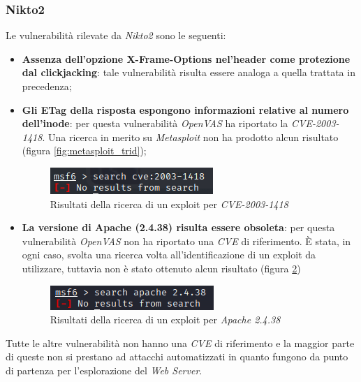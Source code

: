 \subsubsection{Nikto2}
Le vulnerabilità rilevate da \emph{Nikto2} sono le seguenti:
\begin{itemize}
    \item \textbf{Assenza dell'opzione X-Frame-Options nel'header come protezione dal clickjacking}: tale vulnerabilità risulta essere analoga a quella trattata in precedenza;
    \item \textbf{Gli ETag della risposta espongono informazioni relative al numero dell'inode}: per questa vulnerabilità \emph{OpenVAS} ha riportato la \emph{CVE-2003-1418}. Una ricerca in merito su \emph{Metasploit} non ha prodotto alcun risultato (figura \ref{fig:metasploit_trid});
    \begin{figure}[h]
        \centering
        \includegraphics[scale=1]{capitoli/images/metasploit_etag.png}
        \caption{Risultati della ricerca di un exploit per \emph{CVE-2003-1418}}
        \label{fig:metasploit_etag}
    \end{figure}
    \item \textbf{La versione di Apache (2.4.38) risulta essere obsoleta}: per questa vulnerabilità \emph{OpenVAS} non ha riportato una \emph{CVE} di riferimento. È stata, in ogni caso, svolta una ricerca volta all'identificazione di un exploit da utilizzare, tuttavia non è stato ottenuto alcun risultato (figura \ref{fig:metasploit_apache})
    \begin{figure}[h]
        \centering
        \includegraphics[scale=1]{capitoli/images/metasploit_apache.png}
        \caption{Risultati della ricerca di un exploit per \emph{Apache 2.4.38}}
        \label{fig:metasploit_apache}
    \end{figure}
\end{itemize}
Tutte le altre vulnerabilità non hanno una \emph{CVE} di riferimento e la maggior parte di queste non si prestano ad attacchi automatizzati in quanto fungono da punto di partenza per l'esplorazione del \emph{Web Server}. 

